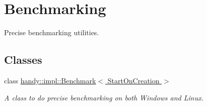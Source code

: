 \hypertarget{group__BenchmarkGroup}{}\section{Benchmarking}
\label{group__BenchmarkGroup}


Precise benchmarking utilities.  


\subsection*{Classes}
\begin{DoxyCompactItemize}
\item 
class \hyperlink{classhandy_1_1impl_1_1Benchmark}{handy\+::impl\+::\+Benchmark$<$ Start\+On\+Creation $>$}
\begin{DoxyCompactList}\small\item\em A class to do precise benchmarking on both Windows and Linux. \end{DoxyCompactList}\end{DoxyCompactItemize}
